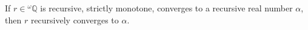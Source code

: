 If $r \in {}^\omega\mathbb{Q}$ is recursive, strictly monotone, converges to a recursive real number $\alpha$, then $r$ recursively converges to $\alpha$.